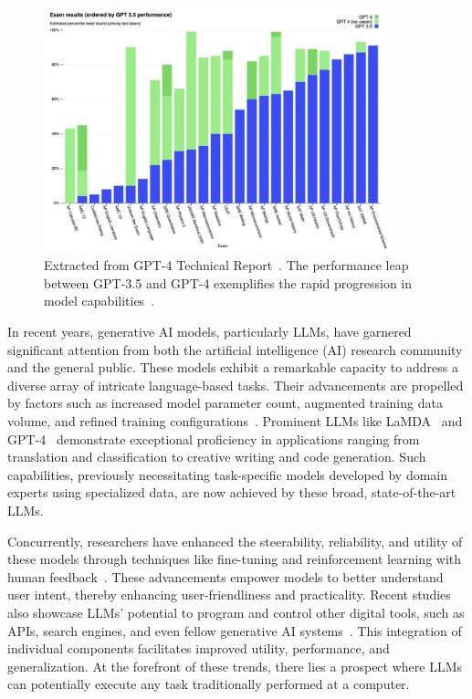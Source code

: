 \documentclass[12pt]{extarticle}
\begin{document}
\begin{figure}[h!]
    \centering
    \includegraphics[width=0.90\textwidth]{img/gpt4_technical_report.jpg}
    \caption{Extracted from GPT-4 Technical Report~\cite{openai2023gpt4}. The performance leap between GPT-3.5 and GPT-4 exemplifies the rapid progression in model capabilities~\cite{openai2023gpt4}.}\label{fig:gpt4_technical_report}
\end{figure}

In recent years, generative AI models, particularly LLMs, have garnered significant attention from both the artificial intelligence (AI) research community and the general public. These models exhibit a remarkable capacity to address a diverse array of intricate language-based tasks. Their advancements are propelled by factors such as increased model parameter count, augmented training data volume, and refined training configurations~\cite{brown2020language, radford2019language, hernandez2021scaling, kaplan2020scaling}. Prominent LLMs like LaMDA~\cite{thoppilan2022lamda} and GPT-4~\cite{openai2023gpt4} demonstrate exceptional proficiency in applications ranging from translation and classification to creative writing and code generation. Such capabilities, previously necessitating task-specific models developed by domain experts using specialized data, are now achieved by these broad, state-of-the-art LLMs.

Concurrently, researchers have enhanced the steerability, reliability, and utility of these models through techniques like fine-tuning and reinforcement learning with human feedback~\cite{ouyang2022training, bai2022training}. These advancements empower models to better understand user intent, thereby enhancing user-friendliness and practicality. Recent studies also showcase LLMs' potential to program and control other digital tools, such as APIs, search engines, and even fellow generative AI systems~\cite{schick2023toolformer, mialon2023augmented}. This integration of individual components facilitates improved utility, performance, and generalization. At the forefront of these trends, there lies a prospect where LLMs can potentially execute any task traditionally performed at a computer.
\end{document}

